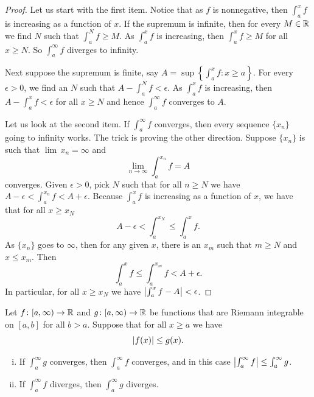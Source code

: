 \begin{proof}
Let us start with the first item.
Notice that as $f$ is nonnegative,
then $\int_a^x f$ is increasing as a function of $x$.
If the supremum is infinite, then for every $M \in {\mathbb{R}}$
we find $N$ such that $\int_a^N f \geq M$.  As $\int_a^x f$
is increasing, then $\int_a^x f \geq M$ for all $x \geq N$.  So
$\int_a^\infty f$ diverges to infinity.

Next suppose the supremum is finite, say
$A = \sup \left\{ \int_a^x f : x \geq a \right\}$.
For every $\epsilon > 0$, we find an $N$ such that
$A - \int_a^N f < \epsilon$.  As $\int_a^x f$ is increasing,
then
$A - \int_a^x f < \epsilon$ for all $x \geq N$ and hence
$\int_a^\infty f$ converges to $A$.

Let us look at the second item.
If $\int_a^\infty f$ converges, then every sequence $\{ x_n \}$ going to
infinity works.  The trick is
proving the other direction.  Suppose $\{ x_n \}$ is such that $\lim\, x_n =
\infty$ and
\begin{equation*}
\lim_{n\to\infty} \int_a^{x_n} f = A
\end{equation*}
converges.  Given $\epsilon > 0$, pick $N$ such that for
all $n \geq N$ we have
$A - \epsilon < \int_a^{x_n} f < A + \epsilon$.
Because $\int_a^x f$ is increasing as a function of $x$, we have that for all
$x \geq x_N$
\begin{equation*}
A - \epsilon < \int_a^{x_N} \leq \int_a^x f .
\end{equation*}
As $\{ x_n \}$ goes to $\infty$, then for any given
$x$, there is an $x_m$ such that $m \geq N$ and $x \leq x_m$.  Then
\begin{equation*}
\int_a^{x} f \leq \int_a^{x_m} f < A + \epsilon .
\end{equation*}
In particular, for all $x \geq x_N$ we have
$\left\lvert {\int_a^{x} f - A} \right\rvert < \epsilon$.
\end{proof}

\begin{prop}
Let
$f \colon [a,\infty) \to {\mathbb{R}}$ and
$g \colon [a,\infty) \to {\mathbb{R}}$ be functions
that are Riemann integrable on $[a,b]$ for all $b > a$.   Suppose
that for all $x \geq a$ we have
\begin{equation*}
\left\lvert {f(x)} \right\rvert \leq g(x) .
\end{equation*}
\begin{enumerate}[(i)]
\item If $\int_a^\infty g$ converges, then $\int_a^\infty f$ converges,
and in this case 
$\left\lvert {\int_a^\infty f} \right\rvert \leq \int_a^\infty g$.
\item If $\int_a^\infty f$ diverges, then $\int_a^\infty g$ diverges.
\end{enumerate}
\end{prop}

